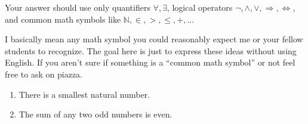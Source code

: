 \documentclass[14pt]{extarticle}
\begin{document}
\begin{enumerate}
Your answer should use only quantifiers $\forall, \exists$, logical operators $\neg, \land, \lor, \Rightarrow, \iff$, and common math symbols like $\mathbb{N}, \in, >, \leq, +, \ldots$ 

I basically mean any math symbol you could reasonably expect me or your fellow students to recognize. The goal here is just to express these ideas without using English. If you aren't sure if something is a ``common math symbol'' or not feel free to ask on piazza.
\begin{enumerate}
\item There is a smallest natural number.
\item The sum of any two odd numbers is even.
\end{enumerate}
\end{enumerate}
\end{document}
